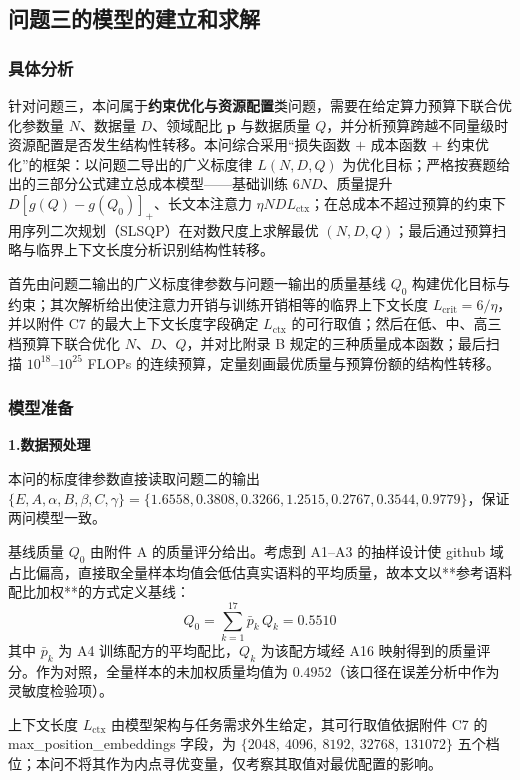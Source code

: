 \subsection{问题三的模型的建立和求解}

\subsubsection{具体分析}

针对问题三，本问属于\textbf{约束优化与资源配置}类问题，需要在给定算力预算下联合优化参数量 $N$、数据量 $D$、领域配比 $\bm p$ 与数据质量 $Q$，并分析预算跨越不同量级时资源配置是否发生结构性转移。本问综合采用“损失函数 $+$ 成本函数 $+$ 约束优化”的框架：以问题二导出的广义标度律 $L(N,D,Q)$ 为优化目标；严格按赛题给出的三部分公式建立总成本模型——基础训练 $6ND$、质量提升 $D[g(Q)-g(Q_0)]_+$、长文本注意力 $\eta N D L_{\text{ctx}}$；在总成本不超过预算的约束下用序列二次规划（SLSQP）在对数尺度上求解最优 $(N,D,Q)$；最后通过预算扫略与临界上下文长度分析识别结构性转移。

首先由问题二输出的广义标度律参数与问题一输出的质量基线 $Q_0$ 构建优化目标与约束；其次解析给出使注意力开销与训练开销相等的临界上下文长度 $L_{\text{crit}}=6/\eta$，并以附件 C7 的最大上下文长度字段确定 $L_{\text{ctx}}$ 的可行取值；然后在低、中、高三档预算下联合优化 $N$、$D$、$Q$，并对比附录 B 规定的三种质量成本函数；最后扫描 $10^{18}$–$10^{25}$ FLOPs 的连续预算，定量刻画最优质量与预算份额的结构性转移。

\subsubsection{模型准备}

\textbf{1.数据预处理}

本问的标度律参数直接读取问题二的输出 $\{E,A,\alpha,B,\beta,C,\gamma\}=\{1.6558,0.3808,0.3266,1.2515,0.2767,0.3544,0.9779\}$，保证两问模型一致。

基线质量 $Q_0$ 由附件 A 的质量评分给出。考虑到 A1--A3 的抽样设计使 github 域占比偏高，直接取全量样本均值会低估真实语料的平均质量，故本文以**参考语料配比加权**的方式定义基线：
\begin{equation}
    Q_0 = \sum_{k=1}^{17} \bar p_k\, Q_k = 0.5510
\end{equation}
其中 $\bar p_k$ 为 A4 训练配方的平均配比，$Q_k$ 为该配方域经 A16 映射得到的质量评分。作为对照，全量样本的未加权质量均值为 $0.4952$（该口径在误差分析中作为灵敏度检验项）。

上下文长度 $L_{\text{ctx}}$ 由模型架构与任务需求外生给定，其可行取值依据附件 C7 的 max\_position\_embeddings 字段，为 $\{2048,\ 4096,\ 8192,\ 32768,\ 131072\}$ 五个档位；本问不将其作为内点寻优变量，仅考察其取值对最优配置的影响。

